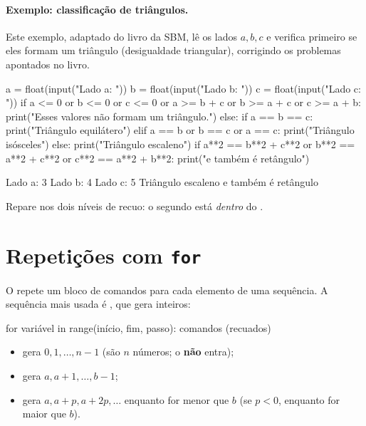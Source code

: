 {{\paragraph{Exemplo: classificação de triângulos.} Este exemplo, adaptado do livro da SBM, lê os lados $a,b,c$ e
verifica primeiro se eles formam um triângulo (desigualdade triangular), corrigindo os problemas apontados no livro.

\begin{entrada}
a = float(input("Lado a: "))
b = float(input("Lado b: "))
c = float(input("Lado c: "))
if a <= 0 or b <= 0 or c <= 0 or a >= b + c or b >= a + c or c >= a + b:
    print("Esses valores não formam um triângulo.")
else:
    if a == b == c:
        print("Triângulo equilátero")
    elif a == b or b == c or a == c:
        print("Triângulo isósceles")
    else:
        print("Triângulo escaleno")
    if a**2 == b**2 + c**2 or b**2 == a**2 + c**2 or c**2 == a**2 + b**2:
        print("e também é retângulo")
\end{entrada}
\begin{saida}
Lado a: 3
Lado b: 4
Lado c: 5
Triângulo escaleno
e também é retângulo
\end{saida}

Repare nos dois níveis de recuo: o segundo  está \emph{dentro} do .

\section{Repetições com \texttt{for}}

O  repete um bloco de comandos para cada elemento de uma sequência. A sequência mais usada é
, que gera inteiros:

\begin{sintaxe}
for variável in range(início, fim, passo):
    comandos (recuados)
\end{sintaxe}

\begin{itemize}
  \item {} gera $0,1,\dots,n-1$ (são $n$ números; o  \textbf{não} entra);
  \item {} gera $a, a+1, \dots, b-1$;
  \item {} gera $a, a+p, a+2p,\dots$ enquanto for menor que $b$ (se $p<0$, enquanto for maior que $b$).
\end{itemize}

}}
